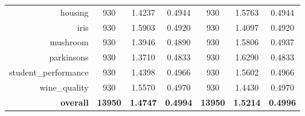 \begin{table}[htbp]
{\begin{tabular}{rcccccc}
                  housing                            & 930                                & \cellcolor[rgb]{ .776,  .937,  .808}\textcolor[rgb]{ 0,  .38,  0}{1.4237}          & 0.4944          & 930                               & 1.5763                                                                    & 0.4944          \\
                  iris                               & 930                                & 1.5903                                                                             & 0.4920          & 930                               & \cellcolor[rgb]{ .776,  .937,  .808}\textcolor[rgb]{ 0,  .38,  0}{1.4097} & 0.4920          \\
                  mushroom                           & 930                                & \cellcolor[rgb]{ .776,  .937,  .808}\textcolor[rgb]{ 0,  .38,  0}{1.3946}          & 0.4890          & 930                               & 1.5806                                                                    & 0.4937          \\
                  parkinsons                         & 930                                & \cellcolor[rgb]{ .776,  .937,  .808}\textcolor[rgb]{ 0,  .38,  0}{1.3710}          & 0.4833          & 930                               & 1.6290                                                                    & 0.4833          \\
                  student\_performance               & 930                                & \cellcolor[rgb]{ .776,  .937,  .808}\textcolor[rgb]{ 0,  .38,  0}{1.4398}          & 0.4966          & 930                               & 1.5602                                                                    & 0.4966          \\
                  wine\_quality                      & 930                                & 1.5570                                                                             & 0.4970          & 930                               & \cellcolor[rgb]{ .776,  .937,  .808}\textcolor[rgb]{ 0,  .38,  0}{1.4430} & 0.4970          \\
                  \midrule
                  \textbf{overall}                   & \textbf{13950}                     & \cellcolor[rgb]{ .776,  .937,  .808}\textcolor[rgb]{ 0,  .38,  0}{\textbf{1.4747}} & \textbf{0.4994} & \textbf{13950}                    & \textbf{1.5214}                                                           & \textbf{0.4996} \\
            \end{tabular}%
      }
\end{table}%

